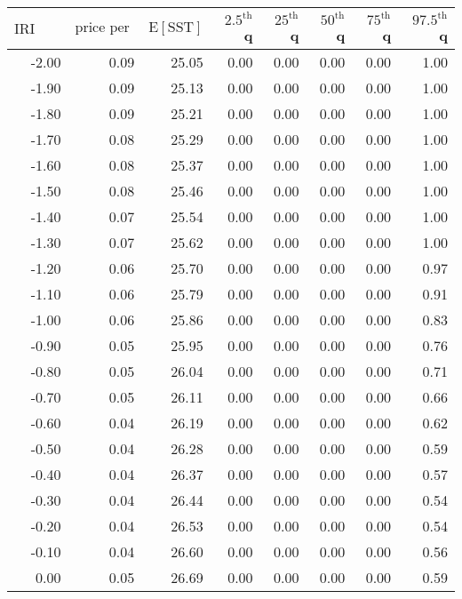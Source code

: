 \begin{table*}[ht]
\centering \footnotesize
\begin{tabular}{rrrrrrrr}
  \hline
$\mbox{IRI anom}$ & $\mbox{price per USD}$ & $\mbox{E}[\mbox{SST}]$ & $2.5^{\mbox{th}}$ q & $25^{\mbox{th}}$ q & $50^{\mbox{th}}$ q & $75^{\mbox{th}}$ q & $97.5^{\mbox{th}}$ q \\ 
  \hline
-2.00 & 0.09 & 25.05 & 0.00 & 0.00 & 0.00 & 0.00 & 1.00 \\ 
  -1.90 & 0.09 & 25.13 & 0.00 & 0.00 & 0.00 & 0.00 & 1.00 \\ 
  -1.80 & 0.09 & 25.21 & 0.00 & 0.00 & 0.00 & 0.00 & 1.00 \\ 
  -1.70 & 0.08 & 25.29 & 0.00 & 0.00 & 0.00 & 0.00 & 1.00 \\ 
  -1.60 & 0.08 & 25.37 & 0.00 & 0.00 & 0.00 & 0.00 & 1.00 \\ 
  -1.50 & 0.08 & 25.46 & 0.00 & 0.00 & 0.00 & 0.00 & 1.00 \\ 
  -1.40 & 0.07 & 25.54 & 0.00 & 0.00 & 0.00 & 0.00 & 1.00 \\ 
  -1.30 & 0.07 & 25.62 & 0.00 & 0.00 & 0.00 & 0.00 & 1.00 \\ 
  -1.20 & 0.06 & 25.70 & 0.00 & 0.00 & 0.00 & 0.00 & 0.97 \\ 
  -1.10 & 0.06 & 25.79 & 0.00 & 0.00 & 0.00 & 0.00 & 0.91 \\ 
  -1.00 & 0.06 & 25.86 & 0.00 & 0.00 & 0.00 & 0.00 & 0.83 \\ 
  -0.90 & 0.05 & 25.95 & 0.00 & 0.00 & 0.00 & 0.00 & 0.76 \\ 
  -0.80 & 0.05 & 26.04 & 0.00 & 0.00 & 0.00 & 0.00 & 0.71 \\ 
  -0.70 & 0.05 & 26.11 & 0.00 & 0.00 & 0.00 & 0.00 & 0.66 \\ 
  -0.60 & 0.04 & 26.19 & 0.00 & 0.00 & 0.00 & 0.00 & 0.62 \\ 
  -0.50 & 0.04 & 26.28 & 0.00 & 0.00 & 0.00 & 0.00 & 0.59 \\ 
  -0.40 & 0.04 & 26.37 & 0.00 & 0.00 & 0.00 & 0.00 & 0.57 \\ 
  -0.30 & 0.04 & 26.44 & 0.00 & 0.00 & 0.00 & 0.00 & 0.54 \\ 
  -0.20 & 0.04 & 26.53 & 0.00 & 0.00 & 0.00 & 0.00 & 0.54 \\ 
  -0.10 & 0.04 & 26.60 & 0.00 & 0.00 & 0.00 & 0.00 & 0.56 \\ 
  0.00 & 0.05 & 26.69 & 0.00 & 0.00 & 0.00 & 0.00 & 0.59 \\ 

\end{tabular}
\end{table*}
